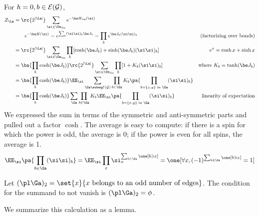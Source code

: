 For $h=0, b\in \cal E(\cal G)$,
\begin{align*}
Z_{\La} &= \rc{2^{|\La|}} \sum_{\si \in \Om_{\La}} e^{-\be H_{\La}(\si)}\\
&\qquad e^{-\be H(\si)} = e^{\sum_b (\si\si)_b \be J_b} = \prod_b e^{\be J_b (\si\si)_b}& \text{(factorizing over bonds)}\\
&=\rc{2^{|\La|}} \sum_{\si\in \Om_{\La}} \prod_b [\cosh(\be J_b) + \sinh(\be J_b)(\si\si)_b]&e^x = \cosh x + \sinh x\\
&=\ba{\prod_b \cosh(\be J_b)} \rc{2^{|\La|}}\sum_{\si\in \Om_{\La}} \prod_b[1+K_b(\si\si)_b]&\text{where }K_b=\tanh(\be J_b)\\
&=\ba{\prod_b \cosh(\be J_b)} \EE_{\si} \sum_{\Ga\subeq \cal E(\cal G)}\prod_{b\in \Ga}K_b \pa{\prod_{b=\{x,y\}\text{ in }\Ga} (\si\si)_b}\\ 
&=\ba{\prod_b \cosh(\be J_b)} \sum_{\Ga}\prod_{b\in \Ga}K_b
\EE_{\si} \pa{\prod_{b=\{x,y\}\text{ in }\Ga} (\si\si)_b}&\text{linearity of expectation}
\end{align*}
We expressed the sum in terms of the symmetric and anti-symmetric parts and pulled out a factor $\cosh$. 
The average is easy to compute: if there is a spin for which the power is odd, the average is 0; if the power is even for all spins, the average is 1.
\[
\EE_{\si} \pa{\prod_{b\in \Ga} (\si\si)_b} = \EE_{\si}\prod_x \si_x^{\sum_{b\in \Ga} \one [b\ni x]}
= \one[\forall x,(-1)^{\sum_{b\in \Ga} \one[b\ni x]}=1]
\]

Let $(\pl \Ga)_2=\set{x}{x\text{ belongs to an odd number of edges}}$. The condition for the summand to not vanish is $(\pl \Ga)_2=\phi$.

We summarize this calculation as a lemma.

%

